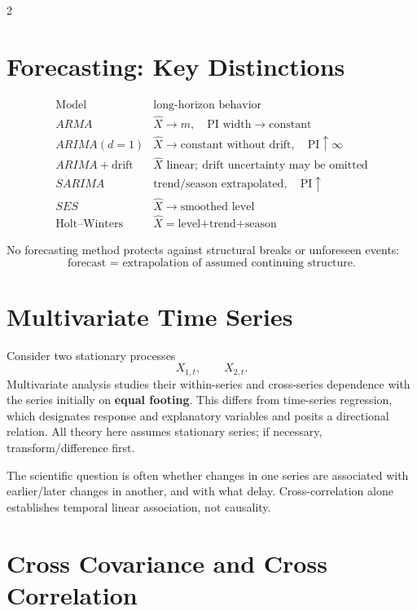 \documentclass[9pt,a4paper]{extarticle}
\newcommand{\key}[1]{\textbf{#1}}
\begin{document}
\begin{multicols}{2}
\section{Forecasting: Key Distinctions}

\[
\boxed{
\begin{array}{c|c}
\text{Model} & \text{long-horizon behavior}\\ \hline
ARMA & \widehat X\to m,\quad \text{PI width}\to\text{constant}\\
ARIMA(d=1) & \widehat X\to\text{constant without drift},\quad\text{PI}\uparrow\infty\\
ARIMA+\text{drift} & \widehat X\text{ linear};\ \text{drift uncertainty may be omitted}\\
SARIMA & \text{trend/season extrapolated},\quad\text{PI}\uparrow\\
SES & \widehat X\to\text{smoothed level}\\
\text{Holt--Winters} & \widehat X=\text{level+trend+season}
\end{array}}
\]

No forecasting method protects against structural breaks or unforeseen events:
\[
\boxed{\text{forecast = extrapolation of assumed continuing structure}.}
\]

\section{Multivariate Time Series}

Consider two stationary processes
\[
X_{1,t},\qquad X_{2,t}.
\]
Multivariate analysis studies their within-series and cross-series dependence with the series initially on \key{equal footing}. This differs from time-series regression, which designates response and explanatory variables and posits a directional relation. All theory here assumes stationary series; if necessary, transform/difference first.

The scientific question is often whether changes in one series are associated with earlier/later changes in another, and with what delay. Cross-correlation alone establishes temporal linear association, not causality.

\section{Cross Covariance and Cross Correlation}


\end{multicols}
\end{document}
